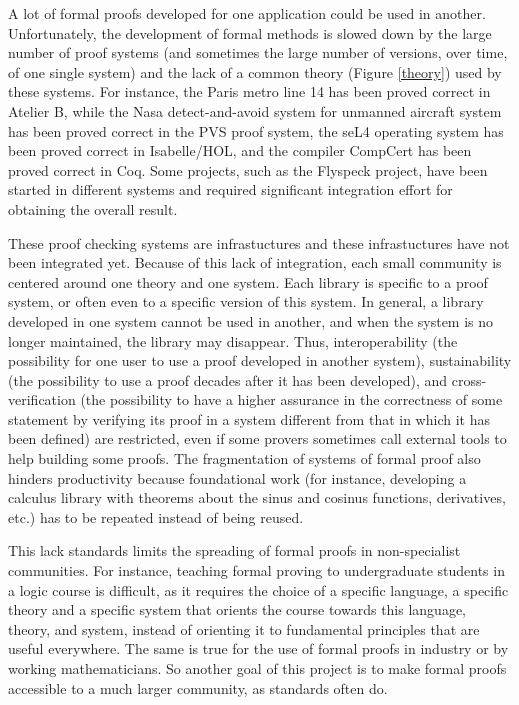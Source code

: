 A lot of formal proofs developed for one application could be used in
another.  Unfortunately, the development of formal methods is slowed
down by the large number of proof systems (and sometimes the large
number of versions, over time, of one single system) and the lack of a
common theory (Figure \ref{theory}) used by these systems.  For
instance, the Paris metro line 14 has been proved correct in {\textsf
  Atelier B}, while the Nasa detect-and-avoid system for unmanned
aircraft system has been proved correct in the {\textsf PVS} proof system,
the seL4 operating system has been proved correct in {\textsf
  Isabelle/HOL}, and the compiler CompCert has been proved correct in
{\textsf Coq}.  Some projects, such as the Flyspeck project, have been
started in different systems and required significant integration
effort for obtaining the overall result.

These proof checking systems are infrastuctures and these
infrastuctures have not been integrated yet.  Because of this lack of
integration, each small community is centered around one theory and
one system. Each library is specific to a proof system, or often even
to a specific version of this system. In general, a library developed
in one system cannot be used in another, and when the system is no
longer maintained, the library may disappear.  Thus, interoperability
(the possibility for one user to use a proof developed in another
system), sustainability (the possibility to use a proof decades after
it has been developed), and cross-verification (the possibility to
have a higher assurance in the correctness of some statement by
verifying its proof in a system different from that in which it has
been defined) are restricted, even if some provers sometimes call
external tools to help building some proofs. The fragmentation of
systems of formal proof also hinders productivity because foundational
work (for instance, developing a calculus library with theorems about
the sinus and cosinus functions, derivatives, etc.) has to be repeated
instead of being reused.

This lack standards limits the spreading of formal proofs in
non-specialist communities. For instance, teaching formal proving to
undergraduate students in a logic course is difficult, as it requires
the choice of a specific language, a specific theory and a specific
system that orients the course towards this language, theory, and
system, instead of orienting it to fundamental principles that are
useful everywhere. The same is true for the use of formal proofs in
industry or by working mathematicians. So another goal of this project
is to make formal proofs accessible to a much larger community, as
standards often do.


